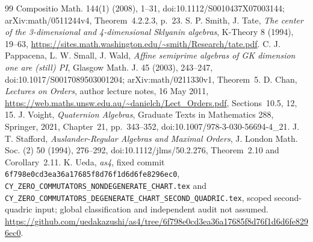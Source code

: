 \documentclass[11pt,a4paper]{ltjsarticle}
\theoremstyle{definition}\newtheorem{definition}[theorem]{定義}
\begin{document}
\begin{thebibliography}{99}
Compositio Math. 144(1) (2008), 1--31,
doi:10.1112/S0010437X07003144;
arXiv:math/0511244v4, Theorem~4.2.2.3, p.~23.
 S. P. Smith, J. Tate,
\emph{The center of the 3-dimensional and 4-dimensional Sklyanin algebras},
K-Theory 8 (1994), 19--63,
\url{https://sites.math.washington.edu/~smith/Research/tate.pdf}.
 C. J. Pappacena, L. W. Small, J. Wald,
\emph{Affine semiprime algebras of GK dimension one are (still) PI},
Glasgow Math. J. 45 (2003), 243--247,
doi:10.1017/S0017089503001204;
arXiv:math/0211330v1, Theorem~5.
 D. Chan,
\emph{Lectures on Orders}, author lecture notes, 16 May 2011,
\url{https://web.maths.unsw.edu.au/~danielch/Lect_Orders.pdf},
Sections~10.5, 12, 15.
 J. Voight,
\emph{Quaternion Algebras}, Graduate Texts in Mathematics 288, Springer, 2021,
Chapter~21, pp.~343--352,
doi:10.1007/978-3-030-56694-4\_21.
 J. T. Stafford,
\emph{Auslander-Regular Algebras and Maximal Orders},
J. London Math. Soc. (2) 50 (1994), 276--292,
doi:10.1112/jlms/50.2.276, Theorem~2.10 and Corollary~2.11.
 K. Ueda, \emph{as4}, fixed commit
\texttt{6f798e0cd3ea36a17685f8d76f1d6d6fe8296ec0},
\texttt{CY\_\allowbreak{}ZERO\_\allowbreak{}COMMUTATORS\_\allowbreak{}NONDEGENERATE\_\allowbreak{}CHART.tex} and\\
\texttt{CY\_\allowbreak{}ZERO\_\allowbreak{}COMMUTATORS\_\allowbreak{}DEGENERATE\_\allowbreak{}CHART\_\allowbreak{}SECOND\_\allowbreak{}QUADRIC.tex},
scoped second-quadric input; global classification and independent audit not assumed.
\url{https://github.com/uedakazushi/as4/tree/6f798e0cd3ea36a17685f8d76f1d6d6fe8296ec0}.
\end{thebibliography}
\end{document}
